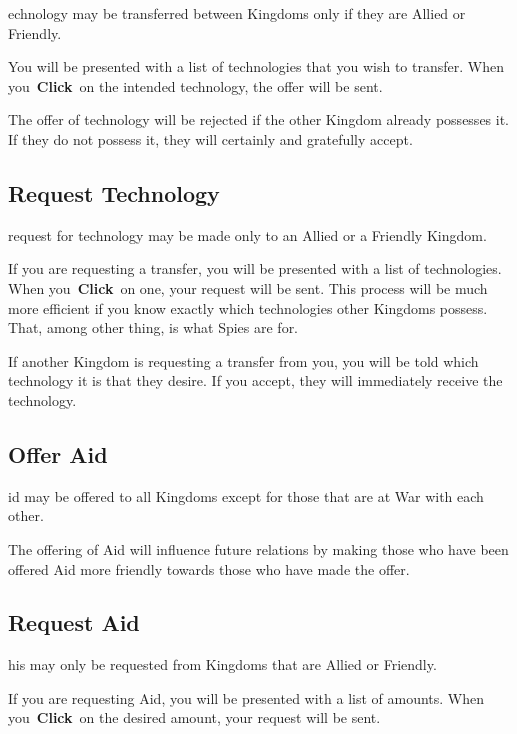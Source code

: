 
echnology may be transferred between Kingdoms only if they are Allied or Friendly.

You will be presented with a list of technologies that you wish to transfer. When you \textbf{Click} on the intended technology, the offer will be sent.

The offer of technology will be rejected if the other Kingdom already possesses it. If they do not possess it, they will certainly and gratefully accept.

\subsection{Request Technology}


 request for technology may be made only to an Allied or a Friendly Kingdom.

If you are requesting a transfer, you will be presented with a list of technologies. When you \textbf{Click} on one, your request will be sent. This process will be much more efficient if you know exactly which technologies other Kingdoms possess. That, among other thing, is what Spies are for.

If another Kingdom is requesting a transfer from you, you will be told which technology it is that they desire. If you accept, they will immediately receive the technology.

\subsection{Offer Aid}

id may be offered to all Kingdoms except for those that are at War with each other.

The offering  of Aid will influence future relations by making those who have been offered Aid more friendly towards those who have made the offer.

\subsection{Request Aid}

his may only be requested from Kingdoms that are Allied or Friendly.

If you are requesting  Aid, you will be presented with a list of amounts. When you \textbf{Click} on the desired amount, your request will be sent.

